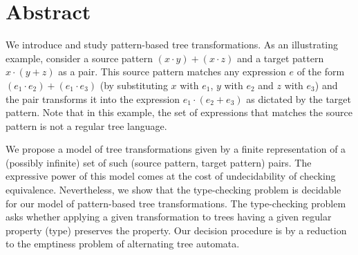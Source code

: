 
\section{Abstract}\label{sec:abstract-trees}

We introduce and study pattern-based tree transformations. As an illustrating example, consider a source pattern $(x\cdot y)+(x\cdot z)$ and a target pattern $x\cdot (y+z)$ as a pair. This source pattern matches any expression $e$ of the form $(e_1\cdot  e_2) + (e_1\cdot  e_3)$ (by substituting $x$ with $e_1$, $y$ with $e_2$ and $z$ with $e_3$) and the pair transforms it into the expression $e_1 \cdot (e_2 + e_3)$ as dictated by the target pattern. Note that in this example, the set of expressions that matches the source pattern is not a regular tree language.

We propose a model of tree transformations given by a finite representation of a (possibly infinite) set of such (source pattern, target pattern) pairs. The expressive power of this model comes at the cost of undecidability of checking equivalence. Nevertheless, we show that the type-checking problem is decidable for our model of pattern-based tree transformations. The type-checking problem asks whether applying a given transformation to trees having a given regular property (type) preserves the property. Our decision procedure is by a reduction to the emptiness problem of alternating tree automata.